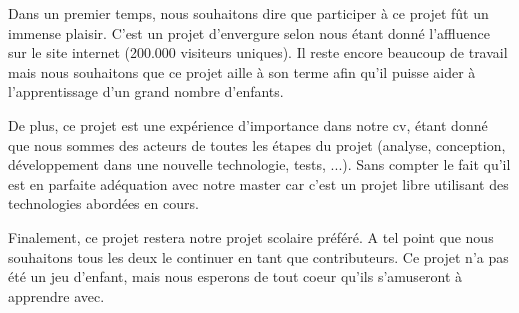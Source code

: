 Dans un premier temps, nous souhaitons dire que participer à ce projet fût un immense plaisir. C'est un projet d'envergure selon nous étant donné l'affluence sur le site internet (200.000 visiteurs uniques). Il reste encore beaucoup de travail mais nous souhaitons que ce projet aille à son terme afin qu'il puisse aider à l'apprentissage d'un grand nombre d'enfants.

De plus, ce projet est une expérience d'importance dans notre cv, étant donné que nous sommes des acteurs de toutes les étapes du projet (analyse, conception, développement dans une nouvelle technologie, tests, ...).
Sans compter le fait qu'il est en parfaite adéquation avec notre master car c'est un projet libre utilisant des technologies abordées en cours.

Finalement, ce projet restera notre projet scolaire préféré. A tel point que nous souhaitons tous les deux le continuer en tant que contributeurs. Ce projet n'a pas été un jeu d'enfant, mais nous esperons de tout coeur qu'ils s'amuseront à apprendre avec.
